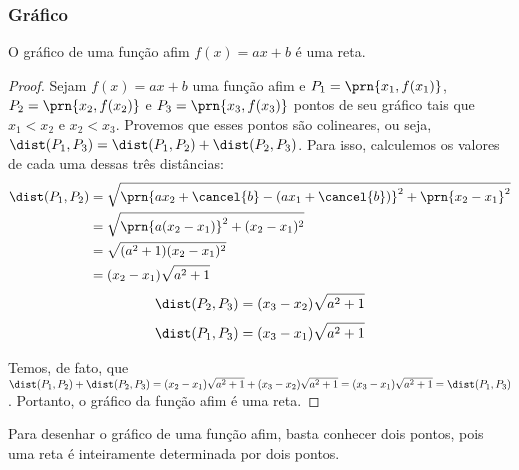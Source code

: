 \subsubsection{Gráfico}

\begin{proposition}
    O gráfico de uma função afim $f(x) = ax + b$ é uma reta.
\end{proposition}

\begin{proof}
    Sejam $f(x)=ax+b$ uma função afim e $P_1 = \prn{x_1, f(x_1)}$, $P_2 = \prn{x_2, f(x_2)}$
    e $P_3 = \prn{x_3, f(x_3)}$ pontos de seu gráfico tais que $x_1 < x_2$ e $x_2 < x_3$. 
    Provemos que esses pontos são colineares, ou seja, $\dist(P_1, P_3) = \dist(P_1, P_2) + \dist(P_2, P_3)$.
    Para isso, calculemos os valores de cada uma dessas três distâncias:
    \begin{align*}
        \dist(P_1, P_2) &= \sqrt{\prn{ax_2+\cancel{b}-(ax_1+\cancel{b})}^2 + \prn{x_2-x_1}^2} \\
        &= \sqrt{\prn{a(x_2-x_1)}^2+(x_2-x_1)^2} \\
        &= \sqrt{(a^2+1)(x_2-x_1)^2}\\
        &= (x_2-x_1)\sqrt{a^2+1}
    \end{align*}
    \begin{align*}
        \dist(P_2, P_3)=(x_3-x_2)\sqrt{a^2+1}
    \end{align*}
    \begin{align*}
        \dist(P_1,P_3)=(x_3-x_1)\sqrt{a^2+1}
    \end{align*}
    
    Temos, de fato, que $\dist(P_1, P_2) + \dist(P_2, P_3) = (x_2-x_1)\sqrt{a^2+1}+(x_3-x_2)\sqrt{a^2+1} = (x_3-x_1)\sqrt{a^2+1} 
    = \dist(P_1,P_3)$. Portanto, o gráfico da função afim é uma reta.
\end{proof}

\begin{remark}
Para desenhar o gráfico de uma função afim, basta conhecer dois pontos, 
pois uma reta é inteiramente determinada por dois pontos.
\end{remark}